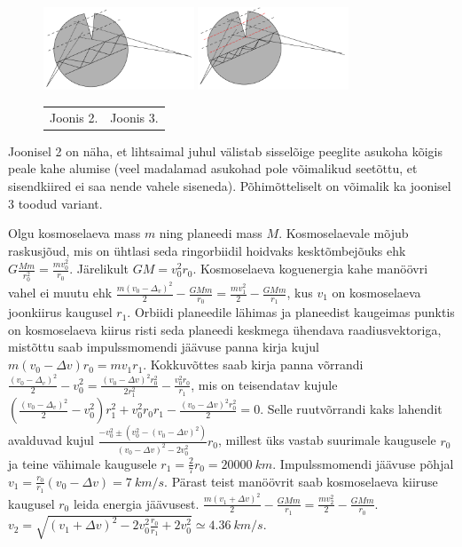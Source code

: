 \documentclass[10pt]{article}
\begin{document}
\begin{figure}[h]
\centering
  \includegraphics[width=0.4\textwidth]{2020-v3g-08-yl2.pdf}
  \includegraphics[width=0.4\textwidth]{2020-v3g-08-yl3.pdf}
  \par
  \begin{tabular}{p{0.5\linewidth}p{0.5\linewidth}}
  \hfil Joonis 2. & \hfil Joonis 3. \\
  \end{tabular}
\end{figure}

Joonisel 2 on näha, et lihtsaimal juhul välistab sisselõige peeglite asukoha kõigis peale kahe alumise (veel madalamad asukohad pole võimalikud seetõttu, et sisendkiired ei saa nende vahele siseneda). Põhimõtteliselt on võimalik ka joonisel 3 toodud variant.
\probend
\bigskip


\solu
Olgu kosmoselaeva mass $m$ ning planeedi mass $M$. Kosmoselaevale mõjub raskusjõud, mis on ühtlasi seda ringorbiidil hoidvaks kesktõmbejõuks ehk $G\frac{Mm}{r_0^2}= \frac{mv_0^2}{r_0}$. Järelikult $GM=v_0^2r_0$. Kosmoselaeva koguenergia kahe manöövri vahel ei muutu ehk $\frac{m(v_0-\Delta_v)^2}{2}-\frac{GMm}{r_0}=\frac{mv_1^2}{2}-\frac{GMm}{r_1}$, kus $v_1$ on kosmoselaeva joonkiirus kaugusel $r_1$. Orbiidi planeedile lähimas ja planeedist kaugeimas punktis on kosmoselaeva kiirus risti seda planeedi keskmega ühendava raadiusvektoriga, mistõttu saab impulssmomendi jäävuse panna kirja kujul $m(v_0-\Delta v)r_0=mv_1r_1$. Kokkuvõttes saab kirja panna võrrandi $\frac{(v_0-\Delta_v)^2}{2}-v_0^2=\frac{(v_0-\Delta v)^2r_0^2}{2r_1^2}-\frac{v_0^2r_0}{r_1}$, mis on teisendatav kujule $\left(\frac{(v_0-\Delta_v)^2}{2}-v_0^2\right)r_1^2+v_0^2r_0r_1-\frac{(v_0-\Delta v)^2r_0^2}{2}=0$. Selle ruutvõrrandi kaks lahendit avalduvad kujul $\frac{-v_0^2\pm\left(v_0^2-\left(v_0-\Delta v\right)^2\right)}{\left(v_0-\Delta v\right)^2-2v_0^2}r_0$, millest üks vastab suurimale kaugusele $r_0$ ja teine vähimale kaugusele $r_1=\frac{2}{7}r_0=\SI{20000}{km}$. Impulssmomendi jäävuse põhjal $v_1=\frac{r_0}{r_1}\left(v_0-\Delta v\right)=\SI{7}{km\per s}$. Pärast teist manöövrit saab kosmoselaeva kiiruse kaugusel $r_0$ leida energia jäävusest. $\frac{m(v_1+\Delta v)^2}{2}-\frac{GMm}{r_1}=\frac{mv_2^2}{2}-\frac{GMm}{r_0}$. $v_2=\sqrt{\left(v_1+\Delta v\right)^2-2v_0^2\frac{r_0}{r_1}+2v_0^2}\simeq\SI{4.36}{km\per s}$.
\probend
\bigskip
\end{document}
